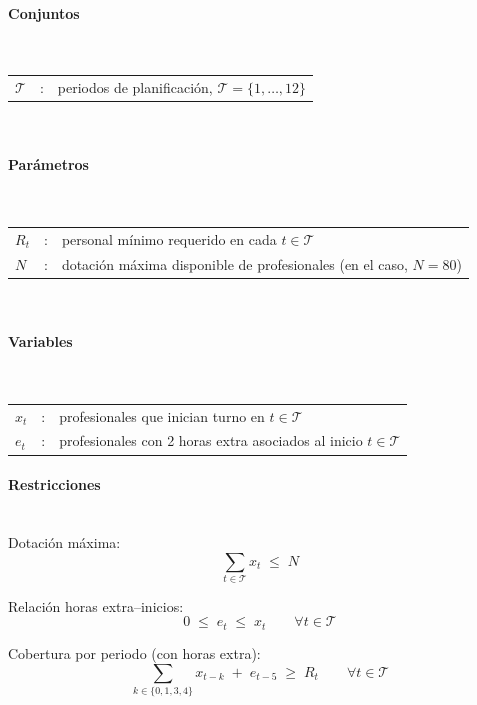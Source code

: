 \paragraph{Conjuntos}\mbox{}\\
\begin{tabular}{l c l}
    $\mathcal{T}$ & : & periodos de planificación, $\mathcal{T}=\{1,\dots,12\}$\\
\end{tabular}
\\

\paragraph{Parámetros}\mbox{}\\
\begin{tabular}{l c l}
    $R_t$ & : & personal mínimo requerido en cada $t\in\mathcal{T}$\\
    $N$   & : & dotación máxima disponible de profesionales (en el caso, $N=80$)\\
\end{tabular}
\\

\paragraph{Variables}\mbox{}\\
\begin{tabular}{l c l}
    $x_t$ & : & profesionales que inician turno en $t\in\mathcal{T}$\\
    $e_t$ & : & profesionales con 2 horas extra asociados al inicio $t\in\mathcal{T}$\\
\end{tabular}

\paragraph{Restricciones}\mbox{}\\
Dotación máxima:
\begin{equation}
    \sum_{t\in\mathcal{T}} x_t \;\leq\; N
\end{equation}

Relación horas extra–inicios:
\begin{equation}
    0 \;\leq\; e_t \;\leq\; x_t \qquad \forall t\in\mathcal{T}
\end{equation}

Cobertura por periodo (con horas extra):
\begin{equation}
    \sum_{k\in\{0,1,3,4\}} x_{t-k} \;+\; e_{t-5} \;\geq\; R_t \qquad \forall t\in\mathcal{T}
\end{equation}

